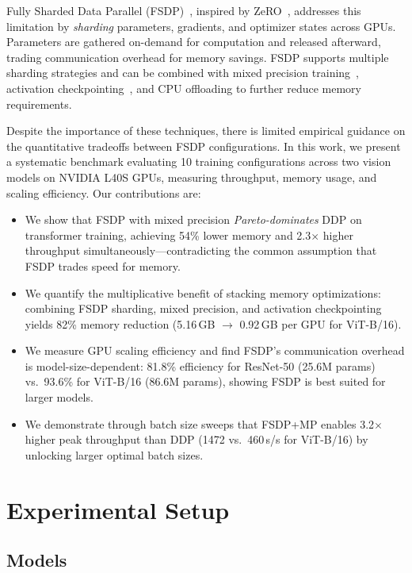 \documentclass[sigconf]{acmart}
\begin{document}
Fully Sharded Data Parallel (FSDP)~\cite{zhao2023fsdp}, inspired by ZeRO~\cite{rajbhandari2020zero}, addresses this limitation by \emph{sharding} parameters, gradients, and optimizer states across GPUs. Parameters are gathered on-demand for computation and released afterward, trading communication overhead for memory savings. FSDP supports multiple sharding strategies and can be combined with mixed precision training~\cite{micikevicius2018mixed}, activation checkpointing~\cite{chen2016checkpointing}, and CPU offloading to further reduce memory requirements.

Despite the importance of these techniques, there is limited empirical guidance on the quantitative tradeoffs between FSDP configurations. In this work, we present a systematic benchmark evaluating 10 training configurations across two vision models on NVIDIA L40S GPUs, measuring throughput, memory usage, and scaling efficiency. Our contributions are:

\begin{itemize}
  \item We show that FSDP with mixed precision \emph{Pareto-dominates} DDP on transformer training, achieving 54\% lower memory and 2.3$\times$ higher throughput simultaneously---contradicting the common assumption that FSDP trades speed for memory.
  \item We quantify the multiplicative benefit of stacking memory optimizations: combining FSDP sharding, mixed precision, and activation checkpointing yields 82\% memory reduction (5.16\,GB $\to$ 0.92\,GB per GPU for ViT-B/16).
  \item We measure GPU scaling efficiency and find FSDP's communication overhead is model-size-dependent: 81.8\% efficiency for ResNet-50 (25.6M params) vs.\ 93.6\% for ViT-B/16 (86.6M params), showing FSDP is best suited for larger models.
  \item We demonstrate through batch size sweeps that FSDP+MP enables 3.2$\times$ higher peak throughput than DDP (1472 vs.\ 460\,s/s for ViT-B/16) by unlocking larger optimal batch sizes.
\end{itemize}

\section{Experimental Setup}

\subsection{Models}
\end{document}
